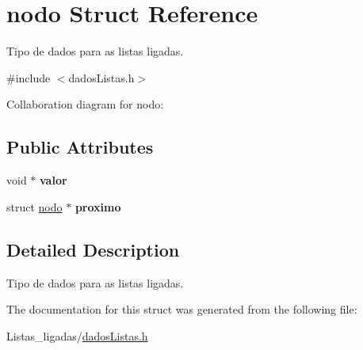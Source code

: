 \hypertarget{structnodo}{}\section{nodo Struct Reference}
\label{structnodo}


Tipo de dados para as listas ligadas.  




{\ttfamily \#include $<$dados\+Listas.\+h$>$}



Collaboration diagram for nodo\+:
\subsection*{Public Attributes}
\begin{DoxyCompactItemize}
\item 
\mbox{\label{structnodo_ab63adcdb83ea1fdcf4fa10f3cafc4a6a}} 
void $\ast$ {\bfseries valor}
\item 
\mbox{\label{structnodo_aaaabdcb6641ddcdac8990402242b154a}} 
struct \hyperlink{structnodo}{nodo} $\ast$ {\bfseries proximo}
\end{DoxyCompactItemize}


\subsection{Detailed Description}
Tipo de dados para as listas ligadas. 

The documentation for this struct was generated from the following file\+:\begin{DoxyCompactItemize}
\item 
Listas\+\_\+ligadas/\hyperlink{dadosListas_8h}{dados\+Listas.\+h}\end{DoxyCompactItemize}
